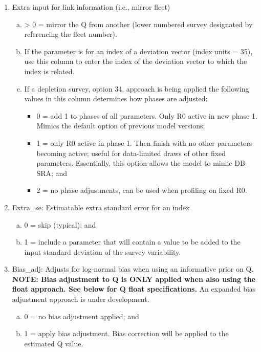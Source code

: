 \begin{enumerate}
\begin{enumerate}[(a)]
	\end{enumerate}
	\item \hypertarget{link_info}{Extra input for link information (i.e., mirror fleet)}
	\begin{enumerate}[(a)]
		\item > 0 = mirror the Q from another (lower numbered survey designated by referencing the fleet number).
		\item If the parameter is for an index of a deviation vector (index units = 35), use this column to enter the index of the deviation vector to which the index is related. 
		\item If a depletion survey, option 34, approach is being applied the following values in this column determines how phases are adjusted:
		\begin{itemize}
			\item 0 = add 1 to phases of all parameters. Only R0 active in new phase 1. Mimics the default option of previous model versions;
			\item 1 = only R0 active in phase 1. Then finish with no other parameters becoming active; useful for data-limited draws of other fixed parameters. Essentially, this option allows the model to mimic DB-SRA; and
			\item 2 = no phase adjustments, can be used when profiling on fixed R0.
		\end{itemize}
	\end{enumerate}
	\item Extra\_se: Estimatable extra standard error for an index
	\begin{enumerate}[(a)]
		\item 0 = skip (typical); and
		\item 1 = include a parameter that will contain a value to be added to the input standard deviation of the survey variability.
	\end{enumerate}
	\item Bias\_adj: Adjusts for log-normal bias when using an informative prior on Q. \textbf{NOTE: Bias adjustment to Q is ONLY applied when also using the float approach. See below for Q float specifications.} An expanded bias adjustment approach is under development.
	\begin{enumerate}[(a)]
		\item 0 = no bias adjustment applied; and
		\item 1 = apply bias adjustment. Bias correction will be applied to the estimated Q value.
	\end{enumerate}

\end{enumerate}
